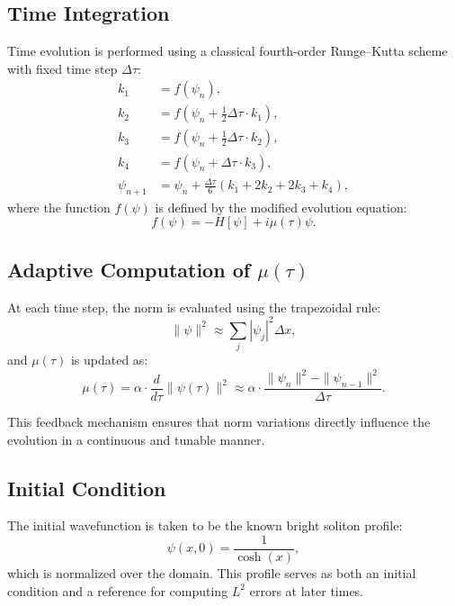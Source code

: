 \documentclass[12pt]{article}
\begin{document}
\subsection*{Time Integration}

Time evolution is performed using a classical fourth-order Runge--Kutta scheme with fixed time step $\Delta \tau$:
\begin{align}
k_1 &= f(\psi_n), \\
k_2 &= f\left(\psi_n + \tfrac{1}{2} \Delta\tau \cdot k_1\right), \\
k_3 &= f\left(\psi_n + \tfrac{1}{2} \Delta\tau \cdot k_2\right), \\
k_4 &= f\left(\psi_n + \Delta\tau \cdot k_3\right), \\
\psi_{n+1} &= \psi_n + \tfrac{\Delta\tau}{6} (k_1 + 2k_2 + 2k_3 + k_4),
\end{align}
where the function $f(\psi)$ is defined by the modified evolution equation:
\begin{equation}
f(\psi) = -H[\psi] + i \mu(\tau) \psi.
\end{equation}

\subsection*{Adaptive Computation of $\mu(\tau)$}

At each time step, the norm is evaluated using the trapezoidal rule:
\begin{equation}
\|\psi\|^2 \approx \sum_j |\psi_j|^2 \Delta x,
\end{equation}
and $\mu(\tau)$ is updated as:
\begin{equation}
\mu(\tau) = \alpha \cdot \frac{d}{d\tau} \|\psi(\tau)\|^2 \approx \alpha \cdot \frac{\|\psi_n\|^2 - \|\psi_{n-1}\|^2}{\Delta\tau}.
\end{equation}

This feedback mechanism ensures that norm variations directly influence the evolution in a continuous and tunable manner.

\subsection*{Initial Condition}

The initial wavefunction is taken to be the known bright soliton profile:
\[
\psi(x,0) = \frac{1}{\cosh(x)},
\]
which is normalized over the domain. This profile serves as both an initial condition and a reference for computing $L^2$ errors at later times.
\end{document}
